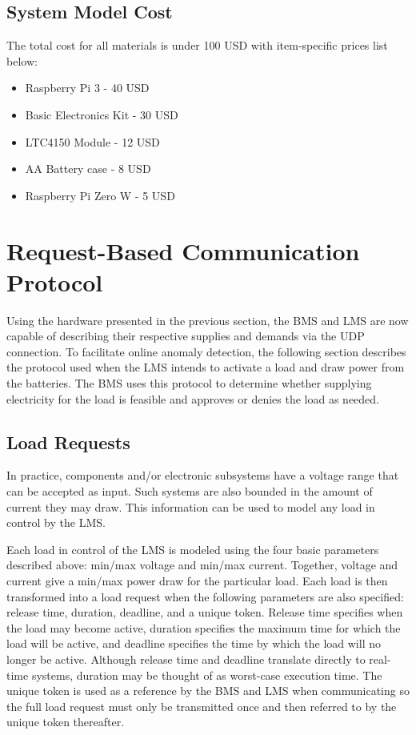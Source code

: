 \documentclass[11pt,conference,draftcls,onecolumn]{IEEEtran}
\begin{document}
\subsection{System Model Cost}
The total cost for all materials is under 100 USD with item-specific prices list below:
\begin{itemize}
    \item Raspberry Pi 3            - 40 USD
    \item Basic Electronics Kit     - 30 USD
    \item LTC4150 Module            - 12 USD
    \item AA Battery case           -  8 USD
    \item Raspberry Pi Zero W       -  5 USD
\end{itemize}

\section{Request-Based Communication Protocol}\label{sec:rbComm}
Using the hardware presented in the previous section, the BMS and LMS are now capable of describing their respective supplies and demands via the UDP connection.
To facilitate online anomaly detection, the following section describes the protocol used when the LMS intends to activate a load and draw power from the batteries.
The BMS uses this protocol to determine whether supplying electricity for the load is feasible and approves or denies the load as needed.

\subsection{Load Requests}
In practice, components and/or electronic subsystems have a voltage range that can be accepted as input.
Such systems are also bounded in the amount of current they may draw.
This information can be used to model any load in control by the LMS.

Each load in control of the LMS is modeled using the four basic parameters described above: min/max voltage and min/max current.
Together, voltage and current give a min/max power draw for the particular load.
Each load is then transformed into a load request when the following parameters are also specified: release time, duration, deadline, and a unique token.
Release time specifies when the load may become active, duration specifies the maximum time for which the load will be active, and deadline specifies the time by which the load will no longer be active.
Although release time and deadline translate directly to real-time systems, duration may be thought of as worst-case execution time.
The unique token is used as a reference by the BMS and LMS when communicating so the full load request must only be transmitted once and then referred to by the unique token thereafter.
\end{document}
